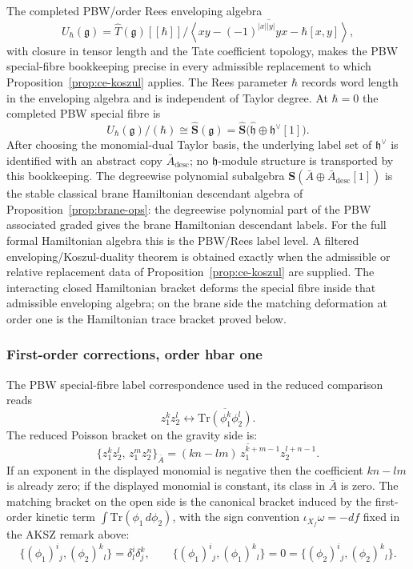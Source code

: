 \documentclass[11pt]{memoir}
\begin{document}
The completed PBW/order Rees enveloping algebra
$$U_{\hbar}(\mathfrak g)
  =\widehat T(\mathfrak g)[[\hbar]]\Big/
  \overline{\left\langle
  xy-(-1)^{|x||y|}yx-\hbar[x,y]\right\rangle},$$
with closure in tensor length and the Tate coefficient topology, makes
the PBW special-fibre bookkeeping precise in every admissible
replacement to which Proposition~\ref{prop:ce-koszul} applies. The Rees
parameter $\hbar$ records word length in the enveloping algebra and is
independent of Taylor degree. At $\hbar=0$ the completed PBW special
fibre is
$$U_{\hbar}(\mathfrak g)/(\hbar)\cong
  \widehat{\mathbf{S}}(\mathfrak g)
  =\widehat{\mathbf{S}}\bigl(\widehat{\mathfrak h}\oplus\mathfrak h^\vee[1]\bigr).$$
After choosing the monomial-dual Taylor basis, the underlying label set
of \(\mathfrak h^\vee\) is identified with an abstract copy
\(\bar A_{\mathrm{desc}}\); no \(\mathfrak h\)-module structure is
transported by this bookkeeping. The degreewise polynomial subalgebra
$\mathbf{S}(\bar A\oplus\bar A_{\mathrm{desc}}[1])$ is the stable
classical brane Hamiltonian descendant algebra of
Proposition~\ref{prop:brane-ops}: the degreewise polynomial part of the
PBW associated graded gives the brane Hamiltonian descendant labels. For
the full formal Hamiltonian algebra this is the PBW/Rees label level.
A filtered enveloping/Koszul-duality theorem is obtained exactly when
the admissible or relative replacement data of
Proposition~\ref{prop:ce-koszul} are supplied. The interacting closed
Hamiltonian bracket deforms the special fibre inside that admissible
enveloping algebra; on the brane side the matching deformation at order
one is the Hamiltonian trace bracket proved below.

\subsubsection{First-order corrections, order hbar one}

The PBW special-fibre label correspondence used in the reduced comparison reads
$$z_1^kz_2^l \leftrightarrow
  \overline{\mathrm{Tr}(\phi_1^k\phi_2^l)}.$$
The reduced Poisson bracket on the gravity side is:
$$\{z_1^kz_2^l,\, z_1^mz_2^n\}_{\bar A}
  =\overline{(kn - lm)\,z_1^{k+m-1}z_2^{l+n-1}}.$$
If an exponent in the displayed monomial is negative then the coefficient
$kn-lm$ is already zero; if the displayed monomial is constant, its class in
$\bar A$ is zero.
The matching bracket on the open side is the canonical bracket induced by the
first-order kinetic term $\int\mathrm{Tr}(\phi_1\,d\phi_2)$, with the sign
convention $\iota_{X_f}\omega=-df$ fixed in the AKSZ remark above:
$$\{(\phi_1)^i{}_j,(\phi_2)^k{}_l\}
  =\delta^i_l\delta^k_j,\qquad
  \{(\phi_1)^i{}_j,(\phi_1)^k{}_l\}=0=\{(\phi_2)^i{}_j,(\phi_2)^k{}_l\}.$$
\end{document}
